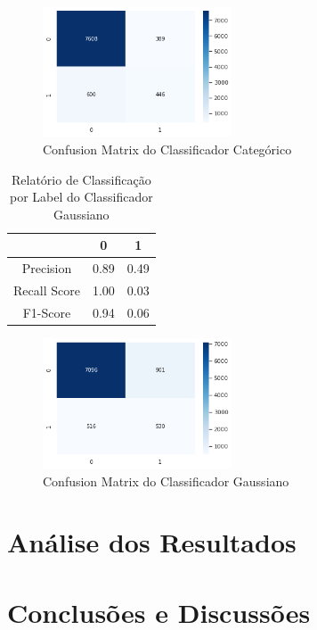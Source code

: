 \documentclass[conference]{IEEEtran}
\begin{document}
\begin{figure}[H]
\centerline{\includegraphics[width=0.5\textwidth]{IMGS/cm-categorico.png}}

\caption{\label{fig:cm1-cnb}Confusion Matrix do Classificador Categórico}
\end{figure}




\begin{table}[H]

	\centering
    \caption{\label{tab:cr1-gnb} Relatório de Classificação por Label do Classificador Gaussiano}
    \begin{small}
        \begin{tabular}{ccc}
        
            \hline
                                    & 0                & 1\\
            \hline
            Precision                & 0.89             & 0.49\\
            Recall Score            & 1.00             & 0.03\\
            F1-Score                & 0.94             & 0.06\\
            
            \hline
        \end{tabular}
    \end{small}

\end{table}


\begin{figure}[H]
\centerline{\includegraphics[width=0.5\textwidth]{IMGS/cm-gaussiano.png}}
\label{cm1-gnb}
\caption{\label{fig:cm1-gnb}Confusion Matrix do Classificador Gaussiano}
\end{figure}



\section{Análise dos Resultados}

\section{Conclusões e Discussões}





\nocite{*}

\end{document}
